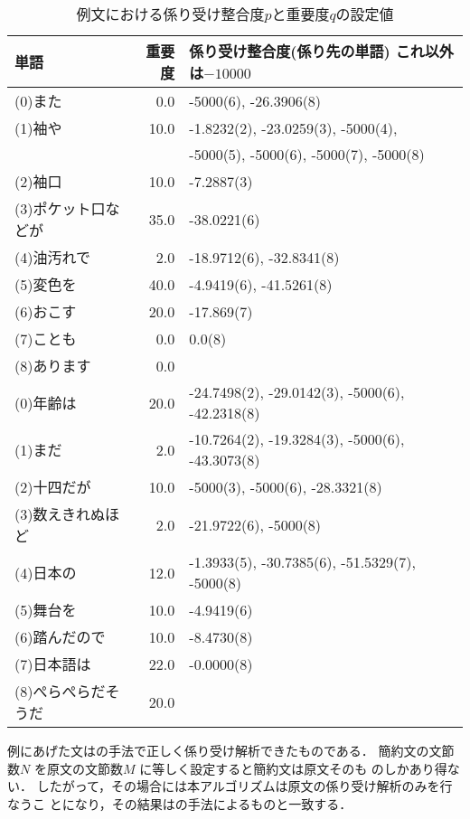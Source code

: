\begin{table}[hntbp] \label{tbl:example}
 \caption{例文における係り受け整合度$p$と重要度$q$の設定値}
 \label{tbl:example}
\vspace*{-1zh}
\begin{footnotesize}
\begin{center}
\begin{tabular}{lrl}
 単語 & 重要度 & 係り受け整合度(係り先の単語) これ以外は$-10000$\\
\hline \hline
 (0)また & 0.0 & -5000(6), -26.3906(8) \\
 (1)袖や & 10.0 & -1.8232(2), -23.0259(3), -5000(4),\\
         &      & -5000(5), -5000(6), -5000(7), -5000(8) \\
 (2)袖口 & 10.0 & -7.2887(3) \\
 (3)ポケット口などが & 35.0 & -38.0221(6) \\
 (4)油汚れで & 2.0 & -18.9712(6), -32.8341(8) \\
 (5)変色を & 40.0 & -4.9419(6), -41.5261(8) \\
 (6)おこす & 20.0 & -17.869(7) \\
 (7)ことも & 0.0 & 0.0(8) \\
 (8)あります & 0.0 & \\
\hline
 (0)年齢は           & 20.0 & -24.7498(2), -29.0142(3), -5000(6), -42.2318(8) \\
 (1)まだ             &  2.0 & -10.7264(2), -19.3284(3), -5000(6), -43.3073(8) \\
 (2)十四だが         & 10.0 & -5000(3), -5000(6), -28.3321(8) \\
 (3)数えきれぬほど   &  2.0 & -21.9722(6), -5000(8) \\
 (4)日本の           & 12.0 & -1.3933(5), -30.7385(6), -51.5329(7), -5000(8) \\
 (5)舞台を           & 10.0 & -4.9419(6) \\
 (6)踏んだので       & 10.0 & -8.4730(8) \\
 (7)日本語は         & 22.0 & -0.0000(8) \\
 (8)ぺらぺらだそうだ & 20.0 & \\
\hline
\end{tabular}
\end{center}
\end{footnotesize}
\end{table}

例にあげた文は\cite{zhang}の手法で正しく係り受け解析できたものである．
簡約文の文節数$N$ を原文の文節数$M$ に等しく設定すると簡約文は原文そのも
のしかあり得ない．
したがって，その場合には本アルゴリズムは原文の係り受け解析のみを行なうこ
とになり，その結果は\cite{zhang}の手法によるものと一致する．

